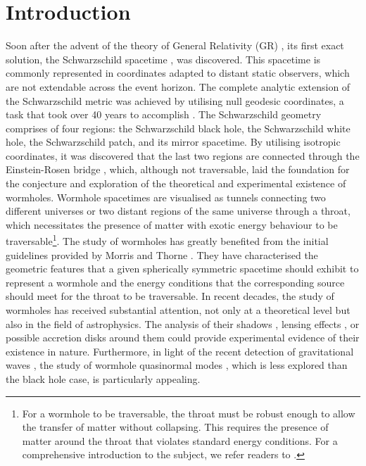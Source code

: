 \documentclass[aps,preprint,groupedaddress,nofootinbib,superscriptaddress,showkeys,showpacs,eqsecnum,amsmath,amssymb]{revtex4-1}
\begin{document}
\maketitle


\section{Introduction}
Soon after the advent of the theory of General Relativity (GR) \cite{Einstein:1915ca,Einstein:1915by}, its first exact solution, the Schwarzschild spacetime \cite{Schwarzschild:1916uq}, was discovered. This spacetime is commonly represented in coordinates adapted to distant static observers, which are not extendable across the event horizon. The complete analytic extension of the Schwarzschild metric was achieved by utilising null geodesic coordinates, a task that took over 40 years to accomplish \cite{Kruskal:1959vx}. The Schwarzschild geometry comprises of four regions: the Schwarzschild black hole, the Schwarzschild white hole, the Schwarzschild patch, and its mirror spacetime. By utilising isotropic coordinates, it was discovered that the last two regions are connected through the Einstein-Rosen bridge \cite{Einstein:1935tc}, which, although not traversable, laid the foundation for the conjecture and exploration of the theoretical and experimental existence of wormholes. Wormhole spacetimes are visualised as tunnels connecting two different universes or two distant regions of the same universe through a throat, which necessitates the presence of matter with exotic energy behaviour to be traversable\footnote{For a wormhole to be traversable, the throat must be robust enough to allow the transfer of matter without collapsing. This requires the presence of matter around the throat that violates standard energy conditions. For a comprehensive introduction to the subject, we refer readers to \cite{Visser:1995cc}.}. The study of wormholes has greatly benefited from the initial guidelines provided by Morris and Thorne \cite{Morris:1988cz}. They have characterised the geometric features that a given spherically symmetric spacetime should exhibit to represent a wormhole and the energy conditions that the corresponding source should meet for the throat to be traversable. In recent decades, the study of wormholes has received substantial attention, not only at a theoretical level but also in the field of astrophysics. The analysis of their shadows \cite{Nedkova:2013msa,Ohgami:2015nra,Shaikh:2018kfv}, lensing effects \cite{Harko:2008vy,Lamy:2018zvj}, or possible accretion disks around them \cite{Harko:2009xf,Zhou:2016koy} could provide experimental evidence of their existence in nature. Furthermore, in light of the recent detection of gravitational waves \cite{LIGOScientific:2016aoc,LIGOScientific:2017vwq}, the study of wormhole quasinormal modes \cite{Konoplya:2018ala,Blazquez-Salcedo:2018ipc}, which is less explored than the black hole case, is particularly appealing.\\
\end{document}
